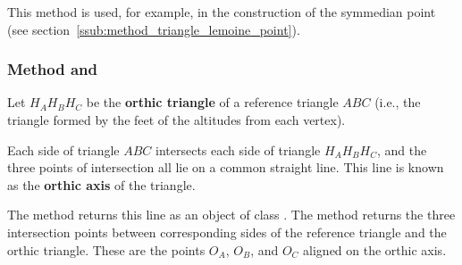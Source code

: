 \medskip
\noindent
This method is used, for example, in the construction of the symmedian point (see section~\ref{ssub:method_triangle_lemoine_point}).

\vspace{1em}
\begin{minipage}{.5\textwidth}
\end{minipage}
\begin{minipage}{.5\textwidth}
\begin{tkzexample}
\end{tkzexample}
\end{minipage}


\subsubsection{Method   and } %
\label{ssub:method_triangle_orthic_axis}
\label{ssub:method_triangle_orthic_axis_points}

Let $H_AH_BH_C$ be the \textbf{orthic triangle} of a reference triangle $ABC$ (i.e., the triangle formed by the feet of the altitudes from each vertex).

\medskip
\noindent
Each side of triangle $ABC$ intersects each side of triangle $H_AH_BH_C$, and the three points of intersection all lie on a common straight line. This line is known as the \textbf{orthic axis} of the triangle.

\medskip
\noindent
The method  returns this line as an object of class .
The method  returns the three intersection points between corresponding sides of the reference triangle and the orthic triangle. These are the points $O_A$, $O_B$, and $O_C$ aligned on the orthic axis.

